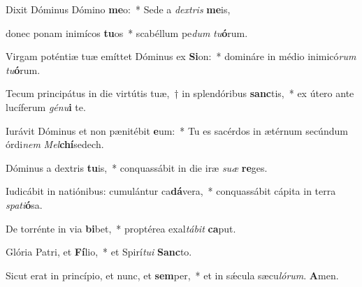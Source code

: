 \item Dixit Dóminus Dómino \textbf{me}o:~* Sede a \textit{dextris} \textbf{me}is,

\item donec ponam inimícos \textbf{tu}os~* scabéllum pe\textit{dum} \textit{tu}\textbf{ó}rum.

\item Virgam poténtiæ tuæ emíttet Dóminus ex \textbf{Si}on:~* domináre in médio inimicó\textit{rum} \textit{tu}\textbf{ó}rum.

\item Tecum principátus in die virtútis tuæ,~† in splendóribus \textbf{sanc}tis,~* ex útero ante lucíferum \textit{génu}\textbf{i} te.

\item Iurávit Dóminus et non pænitébit \textbf{e}um:~* Tu es sacérdos in ætérnum secúndum órdi\textit{nem} \textit{Mel}\textbf{chí}sedech.

\item Dóminus a dextris \textbf{tu}is,~* conquassábit in die iræ \textit{suæ} \textbf{re}ges.

\item Iudicábit in natiónibus: cumulántur ca\textbf{dá}vera,~* conquassábit cápita in terra \textit{spati}\textbf{ó}sa.

\item De torrénte in via \textbf{bi}bet,~* proptérea exal\textit{tábit} \textbf{ca}put.

\item Glória Patri, et \textbf{Fí}lio,~* et Spirí\textit{tui} \textbf{Sanc}to.

\item Sicut erat in princípio, et nunc, et \textbf{sem}per,~* et in sǽcula sæcu\textit{lórum}. \textbf{A}men.